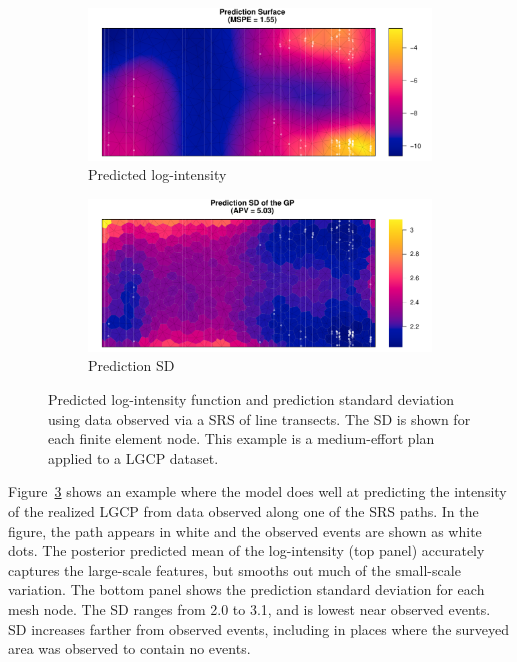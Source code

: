 \documentclass[review]{elsarticle}
\begin{document}
\begin{figure}

\begin{subfigure}{5in}
\includegraphics[width=5in]{../graphics/lambda-SRS000187-LGCP000004.pdf}
\caption{Predicted log-intensity}
\label{lambdasrs000187lgcp}
\end{subfigure}

\begin{subfigure}{5in}
\includegraphics[width=5in]{../graphics/lambdaSD-SRS000187-LGCP000004.pdf}
\caption{Prediction SD}
\label{sdsrs000187lgcp}
\end{subfigure}

\caption{Predicted log-intensity function and prediction standard deviation
using data observed via a SRS of line transects. The SD is shown for each
finite element node. This example is a medium-effort plan applied to a
LGCP dataset.}
\label{srs000187lgcp}
\end{figure}

Figure~\ref{srs000187lgcp} shows an example where the model does well at predicting
the intensity of the realized LGCP from data observed along one of the SRS
paths. In the figure, the path appears in white and the observed events are
shown as white dots. The posterior predicted mean of the log-intensity (top
panel) accurately captures the large-scale features, but smooths out much of
the small-scale variation. The bottom panel shows the prediction standard
deviation for each mesh node. The SD ranges from 2.0 to 3.1, and is lowest
near observed events. SD increases farther from observed events, including
in places where the surveyed area was observed to contain no events.
\end{document}

